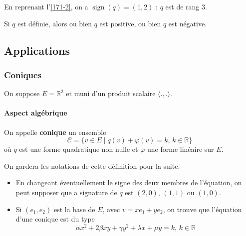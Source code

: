 
  \begin{example}
    En reprenant l'\cref{171-2}, on a $\operatorname{sign}(q) = (1,2)$ : $q$ est de rang $3$.
  \end{example}

  \begin{proposition}
    Si $q$ est définie, alors ou bien $q$ est positive, ou bien $q$ est négative.
  \end{proposition}

  \subsection{Applications}

  \subsubsection{Coniques}


  On suppose $E = \mathbb{R}^2$ et muni d'un produit scalaire $\langle ., . \rangle$.

  \paragraph{Aspect algébrique}

  \begin{definition}
    On appelle \textbf{conique} un ensemble
    \[ \mathcal{C} = \{ v \in E \mid q(v) + \varphi(v) = k, \, k \in \mathbb{R} \} \]
    où $q$ est une forme quadratique non nulle et $\varphi$ une forme linéaire sur $E$.
  \end{definition}

  On gardera les notations de cette définition pour la suite.

  \begin{remark}
    \begin{itemize}
      \item En changeant éventuellement le signe des deux membres de l'équation, on peut supposer que a signature de $q$ est $(2,0)$, $(1,1)$ ou $(1,0)$.
      \item Si $(e_1, e_2)$ est la base de $E$, avec $v = xe_1 + ye_2$, on trouve que l'équation d'une conique est du type
      \[ \alpha x^2 + 2 \beta xy + \gamma y^2 + \lambda x + \mu y = k, \, k \in \mathbb{R} \]
    \end{itemize}
  \end{remark}

